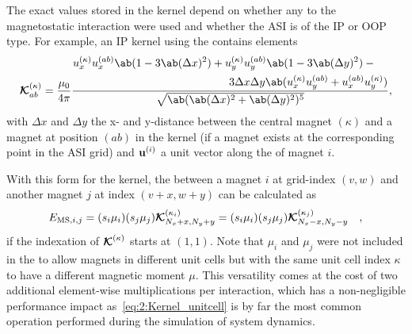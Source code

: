 The exact values stored in the kernel depend on whether any  to the magnetostatic interaction were used and whether the ASI is of the IP or OOP type.
For example, an IP kernel using the  contains elements
\begin{equation}
	\label{eq:2:Kernel_detailed}
	\vc{\mathcal{K}}^{(\kappa)}_{ab} = \frac{\mu_0}{4 \pi} \frac{
		\begin{multlined}
			u_x^{(\kappa)} u_x^{(ab)} \ab(1 - 3 \ab(\Delta x)^2) + u_y^{(\kappa)} u_y^{(ab)} \ab(1 - 3 \ab(\Delta y)^2) - {}\\
			3\Delta x \Delta y \ab(u_x^{(\kappa)} u_y^{(ab)} + u_x^{(ab)} u_y^{(\kappa)})
		\end{multlined}
	}{
		\sqrt{\ab(\ab(\Delta x)^2 + \ab(\Delta y)^2)^5}
	} \mathrm{,}
\end{equation}
with $\Delta x$ and $\Delta y$ the x- and y-distance between the central magnet $(\kappa)$ and a magnet at position $(ab)$ in the kernel (if a magnet exists at the corresponding point in the ASI grid) and $\boldsymbol{\mathbf{u}}^{(i)}$ a unit vector along the  of magnet $i$. \par
With this form for the kernel, the  between a magnet $i$ at grid-index $(v,w)$ and another magnet $j$ at index $(v+x, w+y)$ can be calculated as
\begin{equation}
	\label{eq:2:Kernel_unitcell}
	E_{\mathrm{MS},i,j} = (s_i \mu_i) (s_j \mu_j) \boldsymbol{\mathbf{\mathcal{K}}}^{(\kappa_i)}_{N_x+x, N_y+y} = (s_i \mu_i) (s_j \mu_j) \boldsymbol{\mathbf{\mathcal{K}}}^{(\kappa_j)}_{N_x-x, N_y-y} \quad \mathrm{,}
\end{equation}
if the indexation of $\boldsymbol{\mathbf{\mathcal{K}}}^{(\kappa)}$ starts at $(1,1)$.
Note that $\mu_i$ and $\mu_j$ were not included in the  to allow magnets in different unit cells but with the same unit cell index $\kappa$ to have a different magnetic moment $\mu$.
This versatility comes at the cost of two additional element-wise multiplications per interaction, which has a non-negligible performance impact as~\cref{eq:2:Kernel_unitcell} is by far the most common operation performed during the simulation of system dynamics. \\\par


